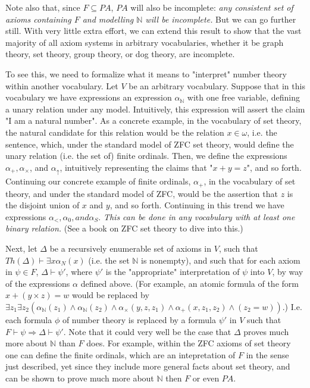 \par Note also that, since $F \subseteq PA$, $PA$ will also be incomplete: \textit{any consistent set of axioms containing $F$ and modelling $\mathbb{N}$ will be incomplete.} But we can go further still. With very little extra effort, we can extend this result to show that the vast majority of all axiom systems in arbitrary vocabularies, whether it be graph theory, set theory, group theory, or dog theory, are incomplete.
\par To see this, we need to formalize what it means to "interpret" number theory within another vocabulary. Let $V$ be an arbitrary vocabulary. Suppose that in this vocabulary we have expressions an expression $\alpha_{\mathbb{N}}$ with one free variable, defining a unary relation under any model. Intuitively, this expression will assert the claim "I am a natural number". As a concrete example, in the vocabulary of set theory, the natural candidate for this relation would be the relation $x \in \omega$, i.e. the sentence, which, under the standard model of ZFC set theory, would define the unary relation (i.e. the set of) finite ordinals. Then, we define the expressions $\alpha_+,\alpha_{\times}$, and $\alpha_{\uparrow}$, intuitively representing the claims that "$x+y = z$", and so forth. Continuing our concrete example of finite ordinals, $\alpha_+$, in the vocabulary of set theory, and under the standard model of ZFC, would be the assertion that $z$ is the disjoint union of $x$ and $y$, and so forth. Continuing in this trend we have expressions $\alpha_<, \alpha_0, and \alpha_S$. \textit{This can be done in any vocabulary with at least one binary relation.} (See a book on ZFC set theory to dive into this.)
\par Next, let $\Delta$ be a recursively enumerable set of axioms in $V$, such that $Th(\Delta) \vdash \exists x \alpha_{N}(x)$ (i.e. the set $\mathbb{N}$ is nonempty), and such that for each axiom in $\psi \in F$, $\Delta \vdash \psi'$, where $\psi'$ is the "appropriate" interpretation of $\psi$ into $V$, by way of the expressions $\alpha$ defined above. (For example, an atomic formula of the form $x+(y \times z) = w$ would be replaced by $\exists z_1 \exists z_2 (\alpha_{\mathbb{N}}(z_1) \wedge \alpha_{\mathbb{N}}(z_2) \wedge \alpha_{\times}(y,z,z_1) \wedge \alpha_+(x,z_1,z_2) \wedge (z_2 = w))$.) I.e. each formula $\phi$ of number theory is replaced by a formula $\psi'$ in $V$ such that $F \vdash \psi \Rightarrow \Delta \vdash \psi'$. Note that it could very well be the case that $\Delta$ proves much more about $\mathbb{N}$ than $F$ does. For example, within the ZFC axioms of set theory one can define the finite ordinals, which are an intepretation of $F$ in the sense just described, yet since they include more general facts about set theory, and can be shown to prove much more about $\mathbb{N}$ then $F$ or even $PA$.
